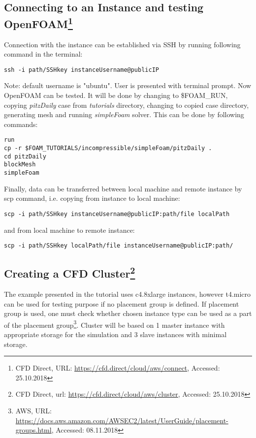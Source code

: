 \documentclass[11pt,english]{article}
\begin{document}
\subsection{Connecting to an Instance and testing OpenFOAM\footnote{CFD Direct, URL: \url{https://cfd.direct/cloud/aws/connect}, Accessed: 25.10.2018}}

Connection with the instance can be established via SSH by running following command in the terminal:
\begin{lstlisting}
ssh -i path/SSHkey instanceUsername@publicIP
\end{lstlisting}	
Note: default username is "ubuntu".
User is presented with terminal prompt. Now OpenFOAM can be tested. It will be done by changing to \$FOAM\_RUN, copying \textit{pitzDaily} case from \textit{tutorials} directory, changing to copied case directory, generating mesh and running \textit{simpleFoam} solver. This can be done by following commands:
\begin{lstlisting}
run
cp -r $FOAM_TUTORIALS/incompressible/simpleFoam/pitzDaily .
cd pitzDaily
blockMesh
simpleFoam
\end{lstlisting}
Finally, data can be transferred between local machine and remote instance by scp command, i.e. copying from instance to local machine:
\begin{lstlisting}
scp -i path/SSHkey instanceUsername@publicIP:path/file localPath
\end{lstlisting}
and from local machine to remote instance:
\begin{lstlisting}
scp -i path/SSHkey localPath/file instanceUsername@publicIP:path/
\end{lstlisting}

\subsection{\label{Creating a CFD Cluster}Creating a CFD Cluster\footnote{CFD Direct, url: \url{https://cfd.direct/cloud/aws/cluster}, Accessed: 25.10.2018}}

The example presented in the tutorial uses c4.8xlarge instances, however t4.micro can be used for testing purpose if no placement group is defined. If placement group is used, one must check whether chosen instance type can be used as a part of the placement group\footnote{AWS, URL: \url{https://docs.aws.amazon.com/AWSEC2/latest/UserGuide/placement-groups.html}, Accessed: 08.11.2018}. Cluster will be based on 1 master instance with appropriate storage for the simulation and 3 slave instances with minimal storage.
\end{document}
